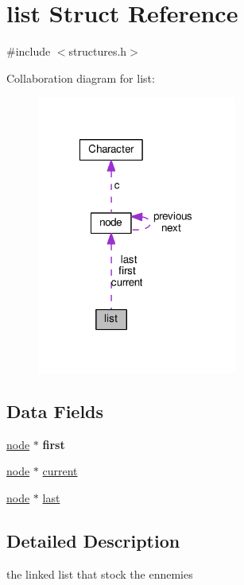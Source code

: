 \hypertarget{structlist}{\section{list Struct Reference}
\label{structlist}
}


{\ttfamily \#include $<$structures.\-h$>$}



Collaboration diagram for list\-:
\nopagebreak
\begin{figure}[H]
\begin{center}
\leavevmode
\includegraphics[width=186pt]{structlist__coll__graph}
\end{center}
\end{figure}
\subsection*{Data Fields}
\begin{DoxyCompactItemize}
\item 
\hypertarget{structlist_a02b4428208fd0060bb54d5bb726702d4}{\hyperlink{structnode}{node} $\ast$ {\bfseries first}}\label{structlist_a02b4428208fd0060bb54d5bb726702d4}

\item 
\hyperlink{structnode}{node} $\ast$ \hyperlink{structlist_a79bec8ecf9f3599d31d97683cc6f6c54}{current}
\item 
\hyperlink{structnode}{node} $\ast$ \hyperlink{structlist_a1e751cb2643f0c20321d5b233e4fdf65}{last}
\end{DoxyCompactItemize}


\subsection{Detailed Description}
the linked list that stock the ennemies 

